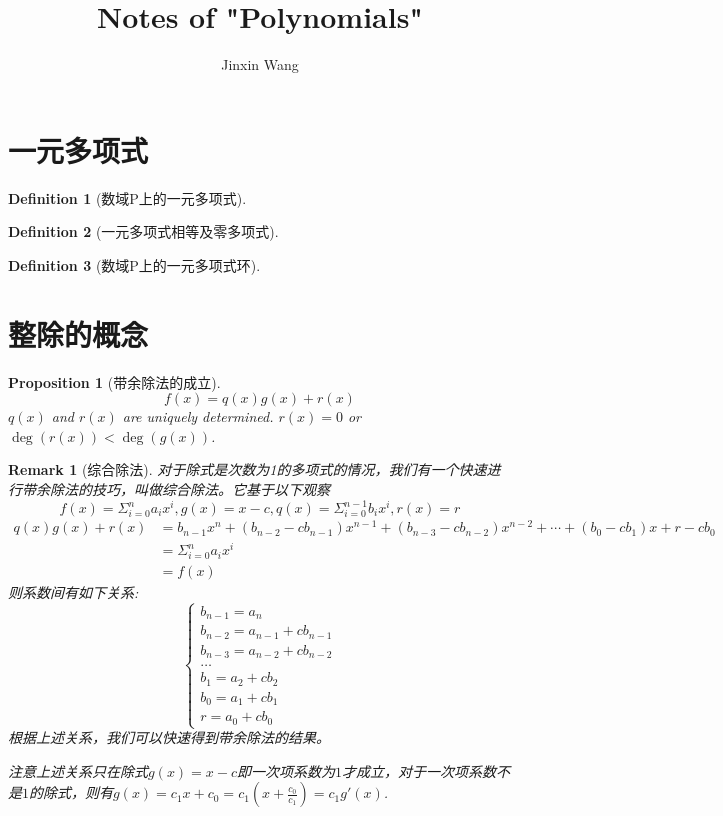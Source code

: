 \documentclass[onecolumn]{ctexart}
\title{Notes of "Polynomials"}
\author{Jinxin Wang}
\date{}
\newtheorem{definition}{Definition}
\newtheorem{proposition}{Proposition}
\newtheorem{remark}{Remark}
\begin{document}
\maketitle

\section{一元多项式}

\begin{definition}[数域P上的一元多项式]
  
\end{definition}

\begin{definition}[一元多项式相等及零多项式]
  
\end{definition}

\begin{definition}[数域P上的一元多项式环]
  
\end{definition}

\section{整除的概念}

\begin{proposition}[带余除法的成立]
  \begin{equation}
    f(x) = q(x)g(x) + r(x)
  \end{equation}
  $q(x)$ and $r(x)$ are uniquely determined. $r(x ) = 0$ or $\deg(r(x)) < \deg(g(x))$.
\end{proposition}
\begin{remark}[综合除法]
  对于除式是次数为1的多项式的情况，我们有一个快速进行带余除法的技巧，叫做综合除法。它基于以下观察
  \[
    f(x) = \Sigma_{i=0}^n a_i x^i, g(x) = x - c, q(x) = \Sigma_{i=0}^{n-1} b_i x^i, r(x) = r
  \]
  \[
    \begin{split}
      q(x)g(x) + r(x) &= b_{n-1} x^n + (b_{n-2} - c b_{n-1}) x^{n-1} + (b_{n-3} - c b_{n-2}) x^{n-2} + \cdots + (b_0 - c b_1) x + r - c b_0 \\
                      &= \Sigma_{i=0}^n a_i x^i \\
                      &= f(x)
    \end{split}
  \]
  则系数间有如下关系:
  \[
    \begin{cases}
      b_{n-1} = a_n \\
      b_{n-2} = a_{n-1} + c b_{n-1} \\
      b_{n-3} = a_{n-2} + c b_{n-2} \\
      \ldots \\
      b_1 = a_2 + c b_2 \\
      b_0 = a_1 + c b_1 \\
      r = a_0 + c b_0
    \end{cases}
  \]
  根据上述关系，我们可以快速得到带余除法的结果。

  注意上述关系只在除式$g(x) = x - c$即一次项系数为$1$才成立，对于一次项系数不是$1$的除式，则有$g(x) = c_1 x + c_0 = c_1 (x + \frac{c_0}{c_1}) = c_1 g'(x)$.
\end{remark}
\end{document}
